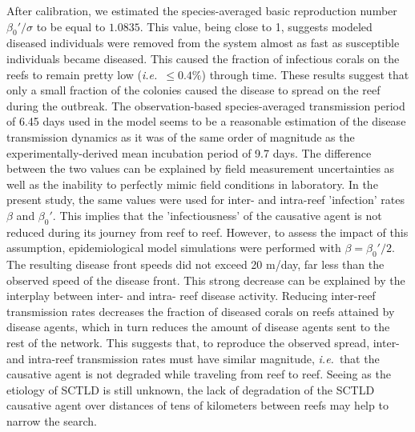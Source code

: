 \documentclass[utf8]{frontiersSCNS}
\newcommand{\ie}{{\it i.e.}\ }
\begin{document}

After calibration, we estimated the species-averaged basic reproduction number $\beta_0'/\sigma$ to be equal to $1.0835$. This value, being close to 1, suggests modeled diseased individuals were removed from the system almost as fast as susceptible individuals became diseased. This caused the fraction of infectious corals on the reefs to remain pretty low (\ie $\leq 0.4\%$) through time. These results suggest that only a small fraction of the colonies caused the disease to spread on the reef during the outbreak. The observation-based species-averaged transmission period of 6.45 days used in the model seems to be a reasonable estimation of the disease transmission dynamics as it was of the same order of magnitude as the experimentally-derived mean incubation period of 9.7 days. The difference between the two values can be explained by field measurement uncertainties as well as the inability to perfectly mimic field conditions in laboratory. In the present study, the same values were used for inter- and intra-reef 'infection' rates $\beta$ and $\beta_0'$. This implies that the 'infectiousness' of the causative agent is not reduced during its journey from reef to reef. However, to assess the impact of this assumption, epidemiological model simulations were performed with $\beta=\beta_0'/2$. The resulting disease front speeds did not exceed 20 m/day, far less than the observed speed of the disease front. This strong decrease can be explained by the interplay between inter- and intra- reef disease activity. Reducing inter-reef transmission rates decreases the fraction of diseased corals on reefs attained by disease agents, which in turn reduces the amount of disease agents sent to the rest of the network. This suggests that, to reproduce the observed spread, inter- and intra-reef transmission rates must have similar magnitude, \ie that the causative agent is not degraded while traveling from reef to reef. Seeing as the etiology of SCTLD is still unknown, the lack of degradation of the SCTLD causative agent over distances of tens of kilometers between reefs may help to narrow the search.

\end{document}
